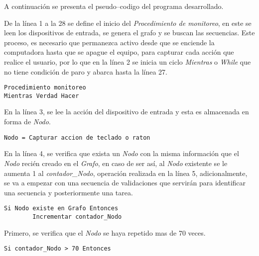 
A continuaci\'on se presenta el pseudo--codigo del programa desarrollado.


De la l\'inea 1 a la 28 se define el inicio del \emph{Procedimiento de 
 monitoreo}, en este se leen los dispositivos de entrada, se genera el grafo 
 y se buscan las secuencias. Este proceso, es necesario que permanezca activo 
 desde que se enciende la computadora hasta que se apague el equipo, para 
 capturar cada acci\'on que realice el usuario, por lo que en la l\'inea 2 se 
 inicia un ciclo \emph{Mientras} o \emph{While} que no tiene condici\'on de 
 paro y abarca hasta la l\'inea 27. 

\begin{tiny}
\begin{lstlisting}[style=C]
Procedimiento monitoreo
Mientras Verdad Hacer
\end{lstlisting}
\end{tiny}

En la l\'inea 3, se lee la acci\'on del dispositivo de entrada y esta es 
 almacenada en forma de \emph{Nodo}.


\begin{tiny}
\begin{lstlisting}[style=C]
    Nodo = Capturar accion de teclado o raton
\end{lstlisting}
\end{tiny}

En la l\'inea 4, se verifica que exista un \emph{Nodo} con la misma 
 informaci\'on que el \emph{Nodo} reci\'en creado en el \emph{Grafo}, en caso 
 de ser as\'i, al \emph{Nodo} existente se le aumenta 1 al 
 \emph{contador\_Nodo}, operaci\'on realizada en la l\'inea 5, 
 adicionalmente, se va a empezar con una secuencia de validaciones que 
 servir\'an para identificar una secuencia y posteriormente una tarea. 

\begin{tiny}
\begin{lstlisting}[style=C]
    Si Nodo existe en Grafo Entonces
        Incrementar contador_Nodo
\end{lstlisting}
\end{tiny}

Primero, se verifica que el \emph{Nodo} se haya repetido mas de 70 veces.

\begin{tiny}
\begin{lstlisting}[style=C]
        Si contador_Nodo > 70 Entonces
\end{lstlisting}
\end{tiny}

